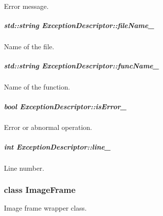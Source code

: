 Error message. 

\hypertarget{group___core_a28d43a19c103c7622e5fb225d9ac81bc}{
\subparagraph[{file\-Name\-\_\-}]{\setlength{\rightskip}{0pt plus 5cm}std\-::string Exception\-Descriptor\-::file\-Name\-\_\-\hspace{0.3cm}{\ttfamily [private]}}}\label{group___core_a28d43a19c103c7622e5fb225d9ac81bc}


Name of the file. 

\hypertarget{group___core_a338c02c76b2631e1948b3d15dd256c5f}{
\subparagraph[{func\-Name\-\_\-}]{\setlength{\rightskip}{0pt plus 5cm}std\-::string Exception\-Descriptor\-::func\-Name\-\_\-\hspace{0.3cm}{\ttfamily [private]}}}\label{group___core_a338c02c76b2631e1948b3d15dd256c5f}


Name of the function. 

\hypertarget{group___core_ae59cb81febf52e97aac91bcc5006c4f0}{
\subparagraph[{is\-Error\-\_\-}]{\setlength{\rightskip}{0pt plus 5cm}bool Exception\-Descriptor\-::is\-Error\-\_\-\hspace{0.3cm}{\ttfamily [private]}}}\label{group___core_ae59cb81febf52e97aac91bcc5006c4f0}


Error or abnormal operation. 

\hypertarget{group___core_aa6b8d6a6cadfe9e645409bb1ab8fd788}{
\subparagraph[{line\-\_\-}]{\setlength{\rightskip}{0pt plus 5cm}int Exception\-Descriptor\-::line\-\_\-\hspace{0.3cm}{\ttfamily [private]}}}\label{group___core_aa6b8d6a6cadfe9e645409bb1ab8fd788}


Line number. 

\label{class_image_frame}
\hypertarget{group___core_class_image_frame}{}
\subsubsection{class Image\-Frame}
Image frame wrapper class. 

